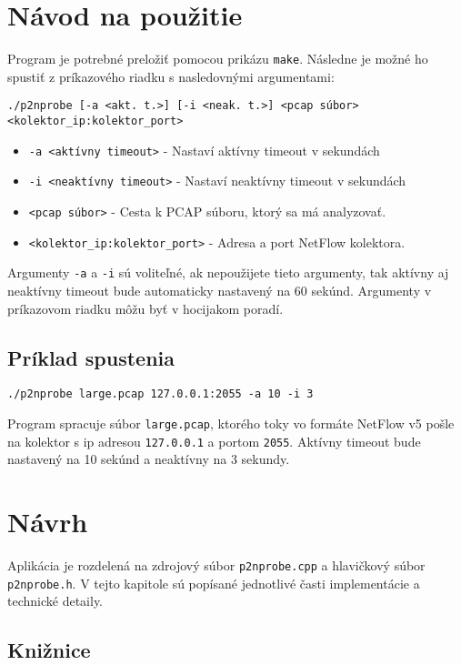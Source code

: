 \documentclass[11pt, a4paper]{article}
\begin{document}
\section{Návod na použitie}
Program je potrebné preložiť pomocou prikázu \texttt{make}. Následne je možné ho spustiť z príkazového riadku s nasledovnými argumentami:
\begin{verbatim}
./p2nprobe [-a <akt. t.>] [-i <neak. t.>] <pcap súbor> <kolektor_ip:kolektor_port>
\end{verbatim}
\begin{itemize}
    \item \texttt{-a <aktívny timeout>} - Nastaví aktívny timeout v sekundách
    \item \texttt{-i <neaktívny timeout>} - Nastaví neaktívny timeout v sekundách
    \item \texttt{<pcap súbor>} - Cesta k PCAP súboru, ktorý sa má analyzovať.
    \item \texttt{<kolektor\_ip:kolektor\_port>} - Adresa a port NetFlow kolektora.
\end{itemize}

Argumenty \texttt{-a} a \texttt{-i} sú voliteľné, ak nepoužijete tieto argumenty, tak aktívny aj neaktívny timeout bude automaticky nastavený na 60 sekúnd. Argumenty v príkazovom riadku môžu byť v hocijakom poradí.
\subsection*{Príklad spustenia}

\begin{verbatim}
./p2nprobe large.pcap 127.0.0.1:2055 -a 10 -i 3 
\end{verbatim}
Program spracuje súbor \texttt{large.pcap}, ktorého toky vo formáte NetFlow v5 pošle na kolektor s ip adresou \texttt{127.0.0.1} a portom \texttt{2055}. Aktívny timeout bude nastavený na 10 sekúnd a neaktívny na 3 sekundy.

\section{Návrh}
Aplikácia je rozdelená na zdrojový súbor \texttt{p2nprobe.cpp} a hlavičkový súbor \texttt{p2nprobe.h}. V tejto kapitole sú popísané jednotlivé časti implementácie a technické detaily.
\vspace{0.3cm}

\subsection*{Knižnice}
\end{document}
